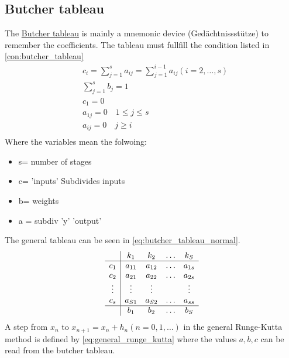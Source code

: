 \subsection{Butcher tableau}
The \href{https://en.wikipedia.org/wiki/Runge%E2%80%93Kutta_methods}{Butcher tableau} is mainly a mnemonic device (Gedächtnissstütze) to remember the coefficients. The tableau must fullfill the condition listed in \autoref{con:butcher_tableau}
\begin{equation}\label{con:butcher_tableau}
\begin{aligned}
& c_i=\sum_{j=1}^s a_{i j}=\sum_{j=1}^{i-1} a_{i j}(i=2, \ldots, s) \\
& \sum_{j=1}^s b_j=1 \\
& c_1=0 \\
& a_{1 j}=0 \quad 1 \leq j \leq s \\
& a_{i j}=0 \quad j \geq i \\
&
\end{aligned}
\end{equation}
Where the variables mean the folwoing:
\begin{itemize}
    \item s= number of stages
    \item c= 'inputs' Subdivides inputs
    \item b= weights
    \item a = subdiv 'y' 'output'
\end{itemize}
The general tableau can be seen in \autoref{eq:butcher_tableau_normal}.
\begin{equation}\label{eq:butcher_tableau_normal}
\begin{array}{c|cccc}
 & k_1 & k_2 & \dots & k_S\\
\hline 
c_1 & a_{11} & a_{12} & \dots & a_{1s}\\
c_2 & a_{21} & a_{22} & \dots & a_{2s}\\
\vdots & \vdots & \vdots & & \vdots \\
c_s & a_{S1} & a_{S2} & \dots & a_{ss}\\
\hline
&b_1&b_2 & \dots & b_S
\end{array}
\end{equation}
A step from $x_n$ to $x_{n+1}=x_n+h_n (n=0,1,\dots)$ in the general Runge-Kutta method is defined by \autoref{eq:general_runge_kutta} where the values $a,b,c$ can be read from the butcher tableau.

